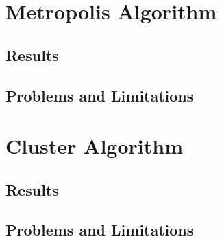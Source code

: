 \documentclass[a4]{scrartcl}
\begin{document}
\section{Metropolis Algorithm}

\subsection{Results}

\subsection{Problems and Limitations}

\section{Cluster Algorithm}

\subsection{Results}

\subsection{Problems and Limitations}

\appendix
\end{document}

